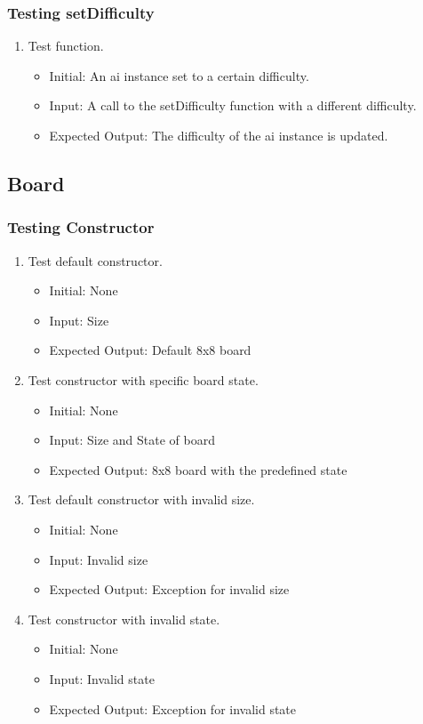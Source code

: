\documentclass[12pt, titlepage]{article}
\begin{document}
\subsubsection {Testing setDifficulty}
\begin{enumerate}
	\item Test function. \begin{itemize}
		      \item Initial: An ai instance set to a certain difficulty.
		      \item Input: A call to the setDifficulty function with a different difficulty.
		      \item Expected Output: The difficulty of the ai instance is updated.
	      \end{itemize}
\end{enumerate}

\subsection {Board}
\subsubsection {Testing Constructor}
\begin{enumerate}
	\item Test default constructor. \begin{itemize}
		      \item Initial: None
		      \item Input: Size
		      \item Expected Output: Default 8x8 board
	      \end{itemize}
	\item Test constructor with specific board state.\begin{itemize}
		      \item Initial: None
		      \item Input: Size and State of board
		      \item Expected Output: 8x8 board with the predefined state
	      \end{itemize}
	\item Test default constructor with invalid size. \begin{itemize}
		      \item Initial: None
		      \item Input: Invalid size
		      \item Expected Output: Exception for invalid size
	      \end{itemize}
	\item Test constructor with invalid state.\begin{itemize}
		      \item Initial: None
		      \item Input: Invalid state
		      \item Expected Output: Exception for invalid state
	      \end{itemize}
\end{enumerate}
\end{document}
